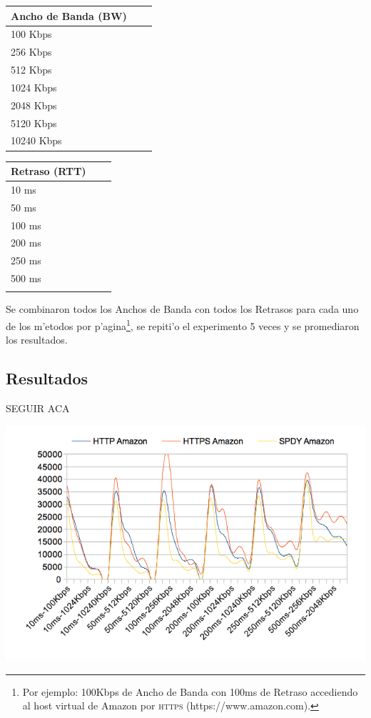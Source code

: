 \documentclass[a4paper,11pt,twocolumns]{article}
\begin{document}
\begin{tabular}{ l c r }
	Ancho de Banda (BW)  \\ \hline
  	100 Kbps \\
	256 Kbps \\
	512 Kbps \\
	1024 Kbps \\
	2048 Kbps \\
	5120 Kbps \\
	10240 Kbps \\
\end{tabular}
\vspace*{1\baselineskip}
\begin{tabular}{ l c r }
	Retraso (RTT) \\ \hline
  	10 ms \\
	50 ms \\
	100 ms \\
	200 ms \\
	250 ms \\
	500 ms \\
	\\
\end{tabular}

Se combinaron todos los Anchos de Banda con todos los Retrasos para cada uno de los m'etodos por p'agina\footnote{Por ejemplo: 100Kbps de Ancho de Banda con 100ms de Retraso accediendo al host virtual de Amazon por \textsc{https} (https://www.amazon.com).}, se repiti'o el experimento 5 veces y se promediaron los resultados.

\subsection{Resultados}

SEGUIR ACA

\includegraphics[scale=0.5]{res_amazon}
\end{document}
